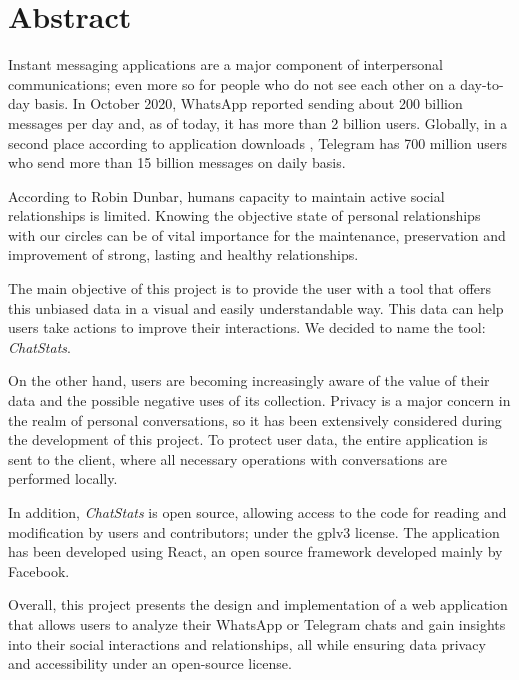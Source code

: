 \cleardoublepage
{}
\chapter*{Abstract}

Instant messaging applications are a major component of interpersonal communications; even more so for people who do not see each other on a day-to-day basis. In October 2020, WhatsApp reported sending about 200 billion messages per day \cite{whatsAppsPerDay} and, as of today, it has more than 2 billion users.\cite{whatsAppsUsers} Globally, in a second place according to application downloads \cite{telegramSecondPlaceGlobally}, Telegram has 700 million users who send more than 15 billion messages on daily basis. \cite{telegramMessagesPerDay}

According to Robin Dunbar, humans capacity to maintain active social relationships is limited.\cite{dunbarNumber} Knowing the objective state of personal relationships with our circles can be of vital importance for the maintenance, preservation and improvement of strong, lasting and healthy relationships.

The main objective of this project is to provide the user with a tool that offers this unbiased data in a visual and easily understandable way. This data can help users take actions to improve their interactions. We decided to name the tool: \textit{ChatStats}.

On the other hand, users are becoming increasingly aware of the value of their data and the possible negative uses of its collection. Privacy is a major concern in the realm of personal conversations, so it has been extensively considered during the development of this project. To protect user data, the entire application is sent to the client, where all necessary operations with conversations are performed locally.

In addition, \textit{ChatStats} is open source, allowing access to the code for reading and modification by users and contributors; under the \acrfull{gplv3} license. The application has been developed using React, an open source framework developed mainly by Facebook.

Overall, this project presents the design and implementation of a web application that allows users to analyze their WhatsApp or Telegram chats and gain insights into their social interactions and relationships, all while ensuring data privacy and accessibility under an open-source license.

